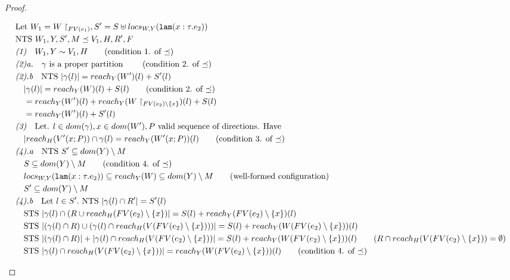 \documentclass{easychair}
\newcommand{\irl}[1]{\mathtt{#1}}
\theoremstyle{definition}
\begin{document}
\begin{proof}
\begin{description}
\begin{align*}
		&\text{Let } W_1 = W \restriction_{FV(e_1)}, S' = S \uplus locs_{W,Y}(\irl{lam}(x : \tau.e_2))\\
		&\text{NTS } W_1,Y,S',M \preceq V_1,H,R',F\\
		&\emph{(1)}\quad W_1,Y \sim V_1,H \tag{condition 1. of $\preceq$}\\
		&\emph{(2)a.}\quad \gamma \text{ is a proper partition } \tag{condition 2. of $\preceq$}\\
		&\emph{(2).b}\quad \text{NTS } |\gamma(l)| = reach_Y(W')(l) + S'(l)\\
		&\quad |\gamma(l)| = reach_Y(W)(l) + S(l) \tag{condition 2. of $\preceq$}\\
		&\quad = reach_Y(W')(l) + reach_Y(W\restriction_{FV(e_2)\setminus \{x\}})(l) + S(l)\\
		&\quad = reach_Y(W')(l) + S'(l)\\
		&\emph{(3)}\quad \text{Let. } l \in dom(\gamma), x \in dom(W'), P \text{ valid sequence of 
		directions. Have }\\
		&\quad |reach_H(V'(x;P)) \cap \gamma(l) = reach_Y(W'(x;P))(l) 
			\tag{condition 3. of $\preceq$}\\
		&\emph{(4).a}\quad \text{NTS } S' \subseteq dom(Y)\setminus M\\
		&\quad S \subseteq dom(Y)\setminus M \tag{condition 4. of $\preceq$}\\
		&\quad locs_{W,Y}(\irl{lam}(x : \tau.e_2)) \subseteq reach_Y(W) \subseteq dom(Y) \setminus M
			\tag{well-formed configuration}\\
		&\quad S' \subseteq dom(Y)\setminus M\\ 
		&\emph{(4).b}\quad \text{Let } l \in S'. \text{ NTS } |\gamma(l) \cap R'| = S'(l)\\
		&\quad \text{STS }  |\gamma(l) \cap (R \cup reach_H(FV(e_2) \setminus \{x\})| = S(l) + 
			reach_Y(FV(e_2) \setminus \{x\})(l)\\
		&\quad \text{STS } |(\gamma(l) \cap R) \cup (\gamma(l) \cap 
			reach_H(V(FV(e_2) \setminus \{x\})))| 
			= S(l) + reach_Y(W(FV(e_2) \setminus \{x\}))(l)\\
		&\quad \text{STS } |(\gamma(l) \cap R)| + |\gamma(l) \cap reach_H(V(FV(e_2) \setminus \{x\}))| 
			= S(l) + reach_Y(W(FV(e_2) \setminus \{x\}))(l) 
			\tag{$R \cap reach_H(V(FV(e_2) \setminus \{x\})) = \emptyset$}\\
		&\quad \text{STS } |\gamma(l) \cap reach_H(V(FV(e_2) \setminus \{x\}))| 
			= reach_Y(W(FV(e_2) \setminus \{x\}))(l) \tag{condition 4. of $\preceq$}\\

\end{align*}
\end{description}
\end{proof}
\end{document}
